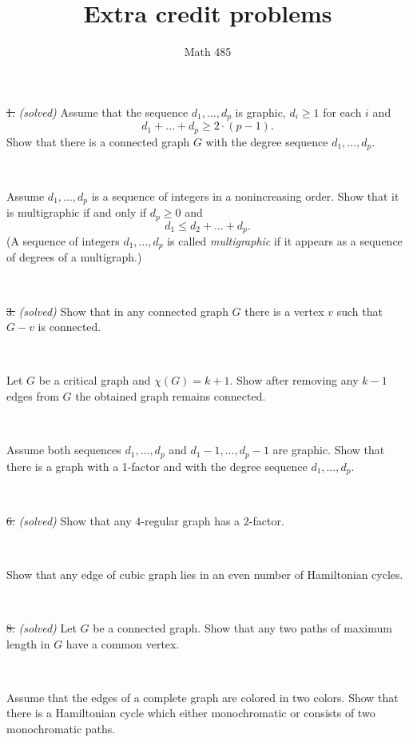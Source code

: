 \documentclass[oneside,a4paper]{article}
\begin{document}
%
\title{Extra credit problems}
\author{Math 485}
\date{}
\maketitle

\textit{}

\noindent \sout{1.} \textit{(solved)}
Assume that the sequence $d_1,\dots, d_p$ is graphic,
$d_i\ge 1$ for each $i$ and 
\[d_1+\dots+d_p\ge 2\cdot(p-1).\]
Show that there is a connected graph $G$ with the degree sequence $d_1,\dots, d_p$.

\ 

Assume $d_1,\dots, d_p$ is a sequence of integers in a nonincreasing order.
Show that it is multigraphic if and only if $d_p\ge0$ and 
\[d_1\le d_2+\dots+d_p.\]
(A sequence of integers $d_1,\dots, d_p$ is called \textit{multigraphic} if it appears as a sequence of degrees of a multigraph.)

\ 

\noindent \sout{3.} \textit{(solved)} 
Show that in any connected graph $G$ there is a vertex $v$ such that $G-v$ is connected.

\ 

Let $G$ be a critical graph and $\chi(G)=k+1$.
Show after removing any $k-1$ edges from $G$  
the obtained graph remains connected. 

\ 

Assume both sequences $d_1,\dots, d_p$
 and $d_1-1,\dots, d_p-1$ are graphic.
Show that there is a graph with a 1-factor and with the degree sequence $d_1,\dots, d_p$.

\ 

\noindent \sout{6.} \textit{(solved)} %
Show that any $4$-regular graph has a $2$-factor.

\ 

Show that any edge of cubic graph lies in an even number of Hamiltonian cycles.

\ 

\noindent \sout{8.} \textit{(solved)} 
Let $G$ be a  connected graph.
Show that any two paths of maximum length in $G$ have a common vertex.

\ 

Assume that the edges of a complete graph are colored in two colors.
Show that there is a Hamiltonian cycle which either monochromatic or consists of two monochromatic paths.
\end{document}
